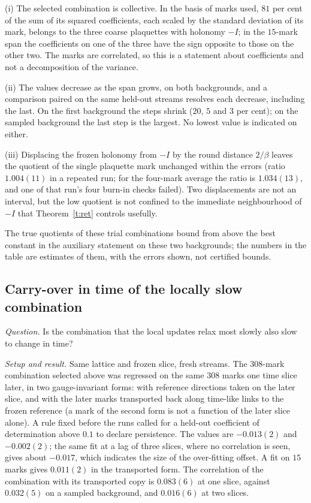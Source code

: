 (i) The selected combination is collective. In the basis of marks used, $81$ per cent of the sum of its
squared coefficients, each scaled by the standard deviation of its mark, belongs to the three coarse
plaquettes with holonomy $-I$; in the $15$-mark span the coefficients on one of the three have the sign
opposite to those on the other two. The marks are correlated, so
this is a statement about coefficients and not a decomposition of the variance.

(ii) The values decrease as the span grows, on both backgrounds, and a comparison paired on the same held-out
streams resolves each decrease, including the last. On the first background the steps shrink ($20$, $5$ and
$3$ per cent); on the sampled background the last step is the largest. No lowest value is indicated on
either.

(iii) Displacing the frozen holonomy from $-I$ by the round distance $2/\beta$ leaves the quotient of the
single plaquette mark unchanged within the errors (ratio $1.004(11)$ in a repeated run; for the four-mark
average the ratio is $1.034(13)$, and one of that run's four burn-in checks failed). Two displacements are
not an interval, but the low quotient is not confined to the immediate neighbourhood of $-I$ that
Theorem~\ref{t:ret} controls usefully.

The true quotients of these trial combinations bound from above the best constant in the auxiliary statement
on these two backgrounds; the numbers in the table are estimates of them, with the errors shown, not certified
bounds.

\subsection{Carry-over in time of the locally slow combination}\label{s:time}
\emph{Question.} Is the combination that the local updates relax most slowly also slow to change in time?

\emph{Setup and result.} Same lattice and frozen slice, fresh streams. The $308$-mark combination selected above was regressed on the
same $308$ marks one time slice later, in two gauge-invariant forms: with reference directions taken on the
later slice, and with the later marks transported back along time-like links to the frozen reference (a mark
of the second form is not a function of the later slice alone). A rule fixed before the runs called for a
held-out coefficient of determination above $0.1$ to declare persistence. The values are $-0.013(2)$ and
$-0.002(2)$; the same fit at a lag of three slices, where no correlation is seen, gives about $-0.017$, which
indicates the size of the over-fitting offset. A fit on $15$ marks gives $0.011(2)$ in the transported form.
The correlation of the combination with its transported copy is $0.083(6)$ at one slice, against $0.032(5)$ on
a sampled background, and $0.016(6)$ at two slices.

